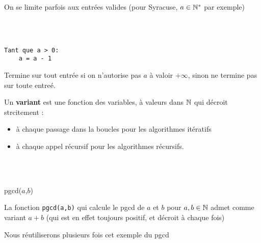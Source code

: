 \begin{rem}
	On se limite parfois aux entrées valides (pour Syracuse, $a \in \mathbb{N}^*$ par exemple)
\end{rem}

\begin{example}
	\enspace \\ \\
	\begin{minipage}{0.4\linewidth}
		\begin{lstlisting}
Tant que a > 0:
    a = a - 1
		\end{lstlisting}
	\end{minipage} \quad \begin{minipage}{0.5\linewidth}
		Termine sur tout entrée si on n'autorise pas $a$ à valoir $+\infty$, sinon ne termine pas sur toute entreé.
	\end{minipage}
\end{example}

\begin{definition}
	Un \textbf{variant} est une fonction des variables, à valeurs dans $\mathbb{N}$ qui décroit strcitement :
	\begin{itemize}
		\item à chaque passage dans la boucles pour les algorithmes itératifs
		\item à chaque appel récursif pour les algorithmes récursifs.
	\end{itemize}
\end{definition}

\begin{example} \enspace \\ \\ \label{1-2}
	\begin{minipage}{0.5 \linewidth}
		\begin{algorithm}[H]
			\caption{pgcd($a$,$b$)}
		\end{algorithm}
	\end{minipage} \quad \begin{minipage}{0.4 \linewidth}
		La fonction \texttt{pgcd(a,b)} qui calcule le pgcd de $a$ et $b$ pour $a, b \in \mathbb{N}$ admet comme variant $a+b$ (qui est en effet toujours positif, et décroit à chaque fois)
	\end{minipage}
\end{example}

\begin{com}
	Nous réutiliserons plusieurs fois cet exemple du pgcd
\end{com}

